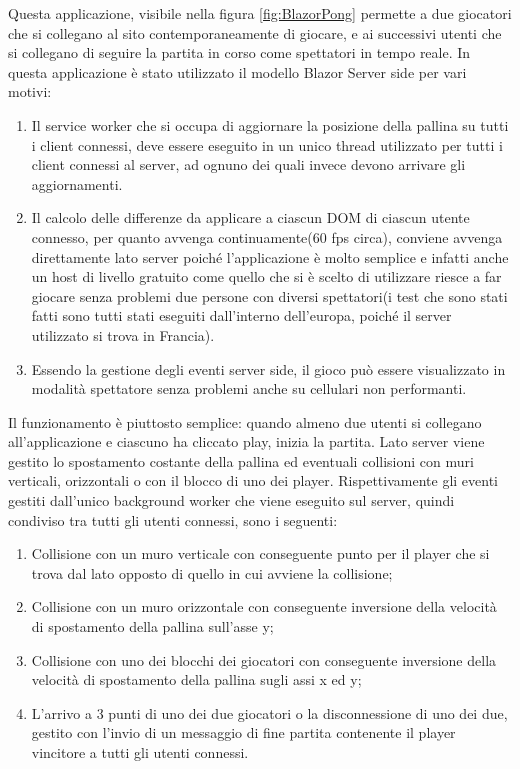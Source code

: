 Questa applicazione, visibile nella figura \ref{fig:BlazorPong} permette a due giocatori che si collegano al sito contemporaneamente di giocare, e ai successivi utenti che si collegano di seguire la partita in corso come spettatori in tempo reale.
In questa applicazione \`e stato utilizzato il modello Blazor Server side per vari motivi:
\begin{enumerate}
	\item Il service worker che si occupa di aggiornare la posizione della pallina su tutti i client connessi, deve essere eseguito in un unico thread utilizzato per tutti i client connessi al server, ad ognuno dei quali invece devono arrivare gli aggiornamenti.
	\item Il calcolo delle differenze da applicare a ciascun DOM di ciascun utente connesso, per quanto avvenga continuamente(60 fps circa), conviene avvenga direttamente lato server poich\'e l'applicazione \`e molto semplice e infatti anche un host di livello gratuito come quello che si \`e scelto di utilizzare riesce a far giocare senza problemi due persone con diversi spettatori(i test che sono stati fatti sono tutti stati eseguiti dall'interno dell'europa, poich\'e il server utilizzato si trova in Francia).
	\item Essendo la gestione degli eventi server side, il gioco pu\`o essere visualizzato in modalit\`a spettatore senza problemi anche su cellulari non performanti.
\end{enumerate}

Il funzionamento \`e piuttosto semplice: quando almeno due utenti si collegano all'applicazione e ciascuno ha cliccato play, inizia la partita.
Lato server viene gestito lo spostamento costante della pallina ed eventuali collisioni con muri verticali, orizzontali o con il blocco di uno dei player.
Rispettivamente gli eventi gestiti dall'unico background worker che viene eseguito sul server, quindi condiviso tra tutti gli utenti connessi, sono i seguenti:
\begin{enumerate}
	\item Collisione con un muro verticale con conseguente punto per il player che si trova dal lato opposto di quello in cui avviene la collisione;
	\item Collisione con un muro orizzontale con conseguente inversione della velocit\`a di spostamento della pallina sull'asse y;
	\item Collisione con uno dei blocchi dei giocatori con conseguente inversione della velocit\`a di spostamento della pallina sugli assi x ed y;
	\item L'arrivo a 3 punti di uno dei due giocatori o la disconnessione di uno dei due, gestito con l'invio di un messaggio di fine partita contenente il player vincitore a tutti gli utenti connessi.
\end{enumerate}

